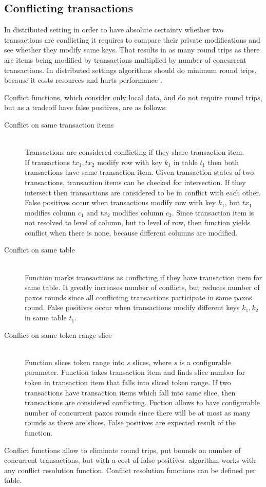 
\subsection{Conflicting transactions}\label{sec:theory:conflictFunctions}
In distributed setting in order to have absolute certainty whether two transactions are conflicting it requires to compare their private modifications and see whether they modify same keys. That results in as many round trips as there are items being modified by transactions multiplied by number of concurrent transactions. In distributed settings algorithms should do minimum round trips, because it costs resources and hurts performance \cite{rotem2006fallacies}.

Conflict functions, which consider only local data, and do not require round trips, but as a tradeoff have false positives, are as follows:
\begin{description}
\item[Conflict on same transaction items] \hfill \\
	Transactions are considered conflicting if they share transaction item. 
	\\
	If transactions $tx_{1}, tx{_2}$ modify row with key $k_{1}$ in table $t_{1}$ then both transactions have same transaction item. Given transaction states of two transactions, transaction items can be checked for intersection.
	If they intersect then transactions are considered to be in conflict with each other. \\
	False positives occur when transactions modify row with key $k_{1}$, but $tx_{1}$ modifies column $c_{1}$ and $tx_{2}$ modifies column $c_{2}$. Since transaction item is not resolved to level of column, but to level of row, then function yields conflict when there is none, because different columns are modified.	
\item[Conflict on same table] \hfill \\
		Function marks transactions as conflicting if they have transaction item for same table. It greatly increases number of conflicts, but reduces number of paxos rounds since all conflicting transactions participate in same paxos round.
		False positives occur when transactions modify different keys $k_{1}, k_{2}$ in same table $t_{1}$. 
\item[Conflict on same token range slice] \hfill \\
		Function slices token range into $s$ slices, where $s$ is a configurable parameter. Function takes transaction item and finds slice number for token in transaction item that falls into sliced token range. If two transactions have transaction items which fall into same slice, then transactions are considered conflicting.
		Fuction allows to have configurable number of concurrent paxos rounds since there will be at most as many rounds as there are slices. False positives are expected result of the function.
\end{description}

Conflict functions allow to eliminate round trips, put bounds on number of concurrent transactions, but with a cost of false positives. \mpp algorithm works with any conflict resolution function. Conflict resolution functions can be defined per table.